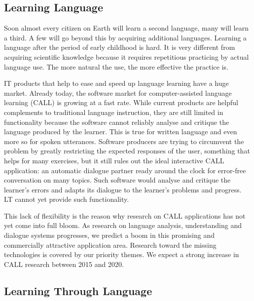 \documentclass[10pt, plain]{../../metanetpaper}
\begin{document}
\begin{multicols}{2}
\subsection{Learning Language}
\label{sec:learning-language}

Soon almost every citizen on Earth will learn a second language, many will learn a third. A few will go beyond this by acquiring additional languages. Learning a language after the period of early childhood is hard. It is very different from acquiring scientific knowledge because it requires repetitious practicing by actual language use. The more natural the use, the more effective the practice is.
 
IT products that help to ease and speed up language learning have a huge market. Already today, the software market for computer-assisted language learning (CALL) is growing at a fast rate. While current products are helpful complements to traditional language instruction, they are still limited in functionality because the software cannot reliably analyse and critique the language produced by the learner. This is true for written language and even more so for spoken utterances. Software producers are trying to circumvent the problem by greatly restricting the expected responses of the user, something that helps for many exercises, but it still rules out the ideal interactive CALL application: an automatic dialogue partner ready around the clock for error-free conversation on many topics. Such software would analyse and critique the learner’s errors and adapts its dialogue to the learner’s problems and progress. LT cannot yet provide such functionality.
 
This lack of flexibility is the reason why research on CALL applications has not yet come into full bloom. As research on language analysis, understanding and dialogue systems progresses, we predict a boom in this promising and commercially attractive application area. Research toward the missing technologies is covered by our priority themes. We expect a strong increase in CALL research between 2015 and 2020.

\subsection{Learning Through Language}
\label{sec:learn-thro-lang}


\end{multicols}
\end{document}
